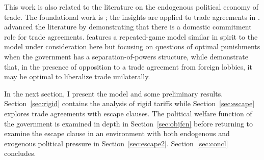 This work is also related to the literature on the endogenous political economy of trade. The foundational work is \Textcite{gh94}; the insights are applied to trade agreements in \Textcite{gh95}. \Textcite{mrc2007} advanced the literature by demonstrating that there is a domestic commitment role for trade agreements. \Textcite{buzard2013a} features a repeated-game model similar in spirit to the model under consideration here but focusing on questions of optimal punishments when the government has a separation-of-powers structure, while \Textcite{coatesludema} demonstrate that, in the presence of opposition to a trade agreement from foreign lobbies, it may be optimal to liberalize trade unilaterally.

In the next section, I present the model and some preliminary results. Section~\ref{sec:rigid} contains the analysis of rigid tariffs while Section~\ref{sec:escape} explores trade agreements with escape clauses. The political welfare function of the government is examined in depth in Section~\ref{sec:objfcn} before returning to examine the escape clause in an environment with both endogenous and exogenous political pressure in Section~\ref{sec:escape2}. Section~\ref{sec:concl} concludes.